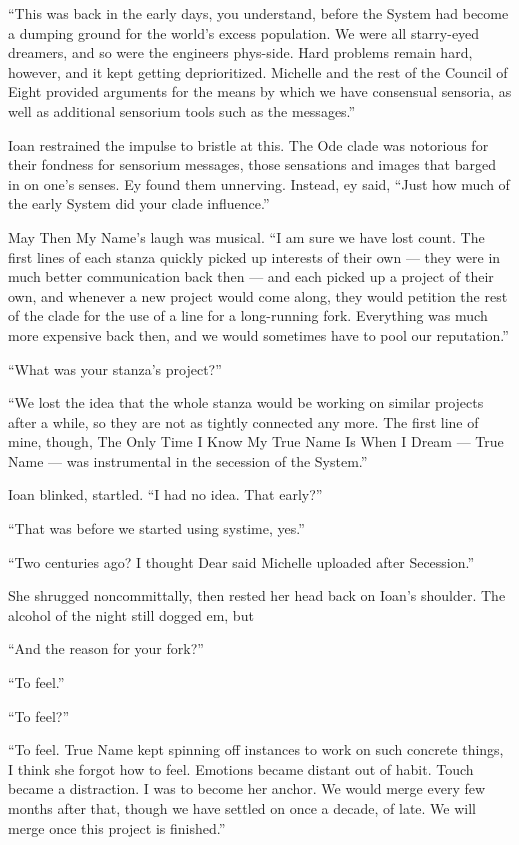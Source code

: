 ``This was back in the early days, you understand, before the System had become a dumping ground for the world's excess population. We were all starry-eyed dreamers, and so were the engineers phys-side. Hard problems remain hard, however, and it kept getting deprioritized. Michelle and the rest of the Council of Eight provided arguments for the means by which we have consensual sensoria, as well as additional sensorium tools such as the messages.''

Ioan restrained the impulse to bristle at this. The Ode clade was notorious for their fondness for sensorium messages, those sensations and images that barged in on one's senses. Ey found them unnerving. Instead, ey said, ``Just how much of the early System did your clade influence.''

May Then My Name's laugh was musical. ``I am sure we have lost count. The first lines of each stanza quickly picked up interests of their own — they were in much better communication back then — and each picked up a project of their own, and whenever a new project would come along, they would petition the rest of the clade for the use of a line for a long-running fork. Everything was much more expensive back then, and we would sometimes have to pool our reputation.''

``What was your stanza's project?''

``We lost the idea that the whole stanza would be working on similar projects after a while, so they are not as tightly connected any more. The first line of mine, though, The Only Time I Know My True Name Is When I Dream — True Name — was instrumental in the secession of the System.''

Ioan blinked, startled. ``I had no idea. That early?''

``That was before we started using systime, yes.''

``Two centuries ago? I thought Dear said Michelle uploaded after Secession.''

She shrugged noncommittally, then rested her head back on Ioan's shoulder. The alcohol of the night still dogged em, but

``And the reason for your fork?''

``To feel.''

``To feel?''

``To feel. True Name kept spinning off instances to work on such concrete things, I think she forgot how to feel. Emotions became distant out of habit. Touch became a distraction. I was to become her anchor. We would merge every few months after that, though we have settled on once a decade, of late. We will merge once this project is finished.''

